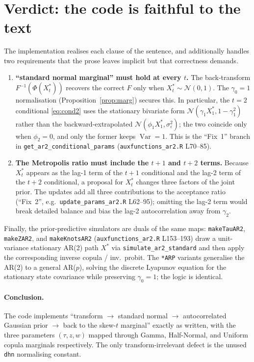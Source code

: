 \documentclass[11pt]{article}
\theoremstyle{definition}
\newcommand{\Var}{\operatorname{Var}}
\newcommand{\Norm}{\mathcal{N}}
\newcommand{\code}[1]{\texttt{#1}}
\begin{document}
\section{Verdict: the code is faithful to the text}
\label{sec:verdict}

The implementation realises each clause of the sentence, and additionally handles
two requirements that the prose leaves implicit but that correctness demands.

\begin{enumerate}[label=(\roman*), leftmargin=*]
\item \textbf{``standard normal marginal'' must hold at every $t$.}
The back-transform $F^{-1}(\Phi(X^\ast_t))$ recovers the correct $F$ only when
$X^\ast_t\sim\Norm(0,1)$. The $\gamma_0=1$ normalisation
(Proposition~\ref{prop:marg}) secures this. In particular, the $t=2$ conditional
\eqref{eq:cond2} uses the stationary bivariate form $\Norm(\gamma_1 X^\ast_1,1-\gamma_1^2)$
rather than the backward-extrapolated $\Norm(\phi_1 X^\ast_1,\sigma_\varepsilon^2)$; the
two coincide only when $\phi_2=0$, and only the former keeps $\Var=1$. This is the
``Fix~1'' branch in \code{get\_ar2\_conditional\_params} (\code{auxfunctions\_ar2.R}
L70--85).

\item \textbf{The Metropolis ratio must include the $t{+}1$ and $t{+}2$ terms.}
Because $X^\ast_t$ appears as the lag-1 term of the $t{+}1$ conditional and the
lag-2 term of the $t{+}2$ conditional, a proposal for $X^\ast_t$ changes three
factors of the joint prior. The updates add all three contributions to the
acceptance ratio (``Fix~2'', e.g.\ \code{update\_params\_ar2.R} L62--95); omitting
the lag-2 term would break detailed balance and bias the lag-2 autocorrelation
away from $\gamma_2$.
\end{enumerate}

Finally, the prior-predictive simulators are duals of the same maps:
\code{makeTauAR2}, \code{makeZAR2}, and \code{makeKnotsAR2}
(\code{auxfunctions\_ar2.R} L153--193) draw a unit-variance stationary AR(2) path
$X^\ast$ via \code{simulate\_ar2\_standard} and then apply the corresponding inverse
copula / inv.\ probit. The \code{*ARP} variants generalise the AR(2) to a general
AR($p$), solving the discrete Lyapunov equation for the stationary state covariance
while preserving $\gamma_0=1$; the logic is identical.

\paragraph{Conclusion.}
The code implements ``transform $\to$ standard normal $\to$ autocorrelated Gaussian
prior $\to$ back to the skew-$t$ marginal'' exactly as written, with the three
parameters $(\tau, z, w)$ mapped through Gamma, Half-Normal, and Uniform copula
marginals respectively. The only transform-irrelevant defect is the unused
\code{dhn} normalising constant.
\end{document}
